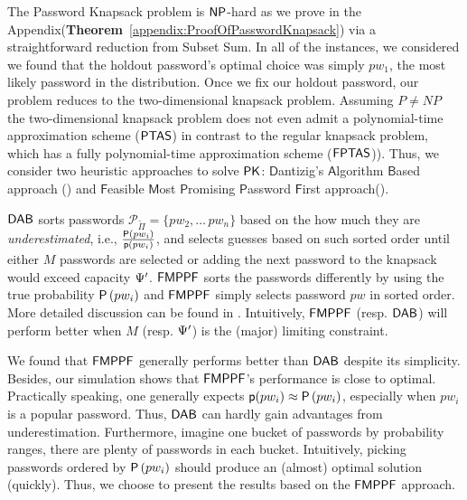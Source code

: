 The \textsf{P}assword \textsf{K}napsack problem is $\mathsf{NP}$-hard as we prove in the Appendix(\textbf{Theorem}~\ref{appendix:ProofOfPasswordKnapsack}) via a straightforward reduction from Subset Sum.  In all of the instances, we considered we found that the holdout password's optimal choice was simply $pw_1$, the most likely password in the distribution. Once we fix our holdout password, our problem reduces to the two-dimensional knapsack problem. Assuming $P\neq NP$ the two-dimensional knapsack problem does not even admit a polynomial-time approximation scheme ($\mathsf{PTAS}$) \cite{kulik2010there} in contrast to the regular knapsack problem, which has a fully polynomial-time approximation scheme ($\mathsf{FPTAS}$)). Thus, we consider two heuristic approaches to solve $\mathsf{PK}$:  $\mathsf{D}$antizig's $\mathsf{A}$lgorithm $\mathsf{B}$ased\cite{Dan:OR57} approach (\DAB) and $\mathsf{F}$easible $\mathsf{M}$ost $\mathsf{P}$romising $\mathsf{P}$assword $\mathsf{F}$irst approach(\FMPPF). 

$\mathsf{DAB}$ sorts passwords $\mathcal{P}_{\tilde{\Pi}} = \{pw_2, \ldots\, pw_n\}$ based on the how much they are \textit{underestimated}, i.e., $\frac{\mathsf{P}\left(pw_i\right)}{\textsf{p}(pw_i)}$, and selects guesses based on such sorted order until either $M$ passwords are selected or adding the next password to the knapsack would exceed capacity $\Psi'$. $\mathsf{FMPPF}$ sorts the passwords differently by using the true probability $\mathsf{P}\left(pw_i\right)$ and  $\mathsf{FMPPF}$ simply selects password $pw$ in sorted order. More detailed discussion can be found in .
Intuitively, $\mathsf{FMPPF}$ (resp. $\mathsf{DAB}$) will perform better when $M$ (resp. $\Psi'$) is the (major) limiting constraint.


We found that $\mathsf{FMPPF}$ generally performs better than $\mathsf{DAB}$ despite its simplicity. Besides, our simulation shows that $\mathsf{FMPPF}$'s performance is close to optimal. Practically speaking, one generally expects $\textsf{p}(pw_i) \approx \mathsf{P}\left(pw_i\right)$, especially when $pw_i$ is a popular password. Thus, $\mathsf{DAB}$ can hardly gain advantages from underestimation. Furthermore, imagine one bucket of passwords by probability ranges, there are plenty of passwords in each bucket. Intuitively, picking passwords ordered by $\mathsf{P}\left(pw_i\right)$ should produce an (almost) optimal solution (quickly). Thus, we choose to present the results based on the $\mathsf{FMPPF}$ approach.

